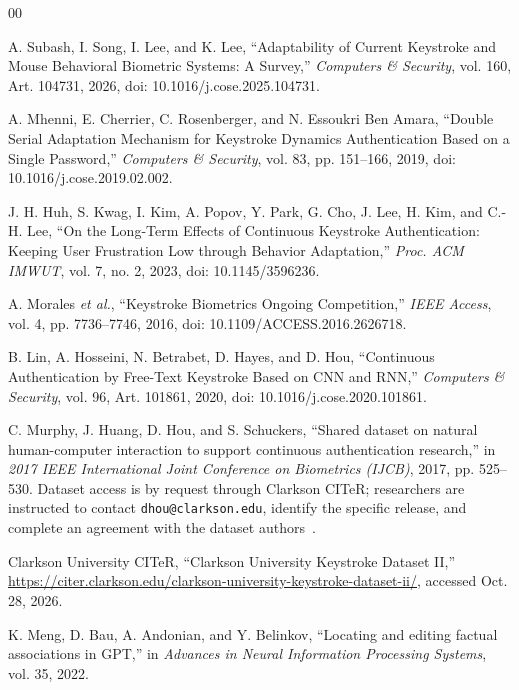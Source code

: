 \documentclass[conference]{IEEEtran}
\begin{document}
\begin{thebibliography}{00}

A. Subash, I. Song, I. Lee, and K. Lee,
``Adaptability of Current Keystroke and Mouse Behavioral Biometric Systems: A Survey,''
\textit{Computers \& Security}, vol. 160, Art. 104731, 2026,
doi: 10.1016/j.cose.2025.104731.

A. Mhenni, E. Cherrier, C. Rosenberger, and N. Essoukri Ben Amara,
``Double Serial Adaptation Mechanism for Keystroke Dynamics Authentication Based on a Single Password,''
\textit{Computers \& Security}, vol. 83, pp. 151--166, 2019,
doi: 10.1016/j.cose.2019.02.002.

J. H. Huh, S. Kwag, I. Kim, A. Popov, Y. Park, G. Cho, J. Lee, H. Kim, and C.-H. Lee,
``On the Long-Term Effects of Continuous Keystroke Authentication: Keeping User Frustration Low through Behavior Adaptation,''
\textit{Proc. ACM IMWUT}, vol. 7, no. 2, 2023,
doi: 10.1145/3596236.

A. Morales \textit{et al.},
``Keystroke Biometrics Ongoing Competition,''
\textit{IEEE Access}, vol. 4, pp. 7736--7746, 2016,
doi: 10.1109/ACCESS.2016.2626718.

B. Lin, A. Hosseini, N. Betrabet, D. Hayes, and D. Hou,
``Continuous Authentication by Free-Text Keystroke Based on CNN and RNN,''
\textit{Computers \& Security}, vol. 96, Art. 101861, 2020,
doi: 10.1016/j.cose.2020.101861.

 C. Murphy, J. Huang, D. Hou, and S. Schuckers,
 ``Shared dataset on natural human-computer interaction to support continuous authentication research,''
 in \textit{2017 IEEE International Joint Conference on Biometrics (IJCB)}, 2017, pp. 525--530.
 Dataset access is by request through Clarkson CITeR; researchers are instructed to contact \texttt{dhou@clarkson.edu}, identify the specific release, and complete an agreement with the dataset authors~\cite{clarkson_access}.

Clarkson University CITeR,
``Clarkson University Keystroke Dataset II,''
\url{https://citer.clarkson.edu/clarkson-university-keystroke-dataset-ii/}, accessed Oct. 28, 2026.

K. Meng, D. Bau, A. Andonian, and Y. Belinkov,
``Locating and editing factual associations in GPT,''
in \textit{Advances in Neural Information Processing Systems},
vol. 35, 2022.

\end{thebibliography}
\end{document}
